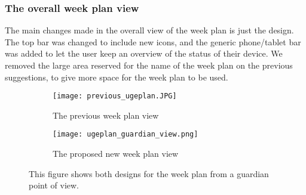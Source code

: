\subsubsection{The overall week plan view}
The main changes made in the overall view of the week plan is just the design. 
The top bar was changed to include new icons, and the generic phone/tablet bar was added to let the user keep an overview of the status of their device.
We removed the large area reserved for the name of the week plan on the previous suggestions, to give more space for the week plan to be used. 
\begin{figure}[H]
    \begin{subfigure}{0.5\textwidth}
    \texttt{[image: previous\_ugeplan.JPG]} 
    \caption{The previous week plan view}
    \label{fig:previous_weekplan_view}
    \end{subfigure}
    \begin{subfigure}{0.5\textwidth}
        \texttt{[image: ugeplan\_guardian\_view.png]}
    \caption{The proposed new week plan view}
    \label{fig:new_weekplan_view}
    \end{subfigure} 
    \caption{This figure shows both designs for the week plan from a guardian point of view.}
    \label{fig:weekplan_view}
\end{figure}

